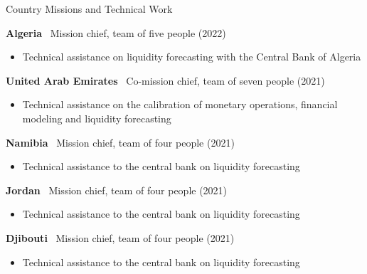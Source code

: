 \documentclass[usegeometry, 10pt, a4paper]{cv} %
\newcommand{\activite}[1]{\textbf{#1}\ }
\newcommand{\midreduce}{-0.5cm}
\begin{document}
\newpage

\begin{rubriquetableau}[0.95\textwidth]{Country Missions and Technical Work}\\
  \vspace{-0.5cm}

  \activite{Algeria} Mission chief, team of five people (2022)\\
  \vspace{\midreduce}
  \begin{itemize}[label={}]
    \item \small{Technical assistance on liquidity forecasting with the
        Central Bank
        of Algeria}
  \end{itemize}
  
  \activite{United Arab Emirates} Co-mission chief, team of seven people (2021)\\
  \vspace{\midreduce}
  \begin{itemize}[label={}]
    \item \small{Technical assistance on the calibration of monetary
        operations, financial modeling and liquidity forecasting}
  \end{itemize}

  \activite{Namibia} Mission chief, team of four people (2021) \\
  \vspace{\midreduce}
  \begin{itemize}[label={}]
    \item \small{Technical assistance to the central bank on liquidity forecasting}
  \end{itemize}

  \activite{Jordan} Mission chief, team of four people (2021)\\
  \vspace{\midreduce}
  \begin{itemize}[label={}]
    \item \small{Technical assistance to the central bank on liquidity forecasting}
  \end{itemize}
  
  \activite{Djibouti} Mission chief, team of four people (2021)\\
  \vspace{\midreduce}
  \begin{itemize}[label={}]
    \item \small{Technical assistance to the central bank on liquidity forecasting}
  \end{itemize}


\end{rubriquetableau}
\end{document}
